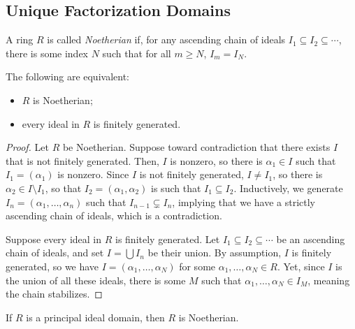 \documentclass[10pt]{mypackage}
\begin{document}
\subsection{Unique Factorization Domains}%
\begin{definition}
  A ring $R$ is called \textit{Noetherian} if, for any ascending chain of ideals $I_1\subseteq I_2\subseteq\cdots$, there is some index $N$ such that for all $m\geq N$, $I_m = I_N$.
\end{definition}
\begin{proposition}
  The following are equivalent:
  \begin{itemize}
    \item $R$ is Noetherian;
    \item every ideal in $R$ is finitely generated.
  \end{itemize}
\end{proposition}
\begin{proof}
  Let $R$ be Noetherian. Suppose toward contradiction that there exists $I$ that is not finitely generated. Then, $I$ is nonzero, so there is $\alpha_1\in I$ such that $I_1 = \left( \alpha_1 \right)$ is nonzero. Since $I$ is not finitely generated, $I\neq I_1$, so there is $\alpha_2\in I\setminus I_1$, so that $I_2 = \left( \alpha_1,\alpha_2 \right)$ is such that $I_1\subseteq I_2$. Inductively, we generate $I_n = \left( \alpha_1,\dots,\alpha_n \right)$ such that $I_{n-1}\subsetneq I_n$, implying that we have a strictly ascending chain of ideals, which is a contradiction.%

  Suppose every ideal in $R$ is finitely generated. Let $I_1\subseteq I_2\subseteq\cdots$ be an ascending chain of ideals, and set $I = \bigcup I_n$ be their union. By assumption, $I$ is finitely generated, so we have $I = \left( \alpha_1,\dots,\alpha_N \right)$ for some $\alpha_1,\dots,\alpha_N\in R$. Yet, since $I$ is the union of all these ideals, there is some $M$ such that $\alpha_1,\dots,\alpha_N\in I_M$, meaning the chain stabilizes.
\end{proof}
\begin{corollary}
  If $R$ is a principal ideal domain, then $R$ is Noetherian.
\end{corollary}
\end{document}
